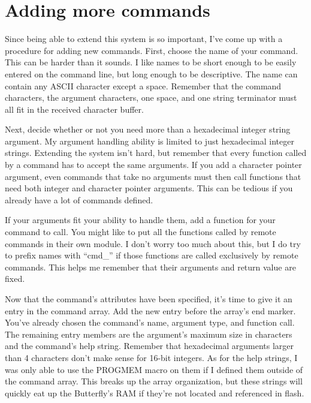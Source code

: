 \clearpage{}
\section{Adding more commands}
Since being able to extend this system is so important, I've come up with a procedure for adding new commands.  First, choose the name of your command.  This can be harder than it sounds.  I like names to be short enough to be easily entered on the command line, but long enough to be descriptive.  The name can contain any ASCII character except a space.  Remember that the command characters, the argument characters, one space, and one string terminator must all fit in the received character buffer.
    
Next, decide whether or not you need more than a hexadecimal integer string argument.  My argument handling ability is limited to just hexadecimal integer strings.  Extending the system isn't hard, but remember that every function called by a command has to accept the same arguments.  If you add a character pointer argument, even commands that take no arguments must then call functions that need both integer and character pointer arguments.  This can be tedious if you already have a lot of commands defined.

If your arguments fit your ability to handle them, add a function for your command to call.  You might like to put all the functions called by remote commands in their own module.  I don't worry too much about this, but I do try to prefix names with ``cmd\_'' if those functions are called exclusively by remote commands.  This helps me remember that their arguments and return value are fixed.

Now that the command's attributes have been specified, it's time to give it an entry in the command array.  Add the new entry before the array's end marker.  You've already chosen the command's name, argument type, and function call.  The remaining entry members are the argument's maximum size in characters and the command's help string.  Remember that hexadecimal arguments larger than 4 characters don't make sense for 16-bit integers.  As for the help strings, I was only able to use the PROGMEM macro on them if I defined them outside of the command array.  This breaks up the array organization, but these strings will quickly eat up the Butterfly's RAM if they're not located and referenced in flash.  


\clearpage{}
